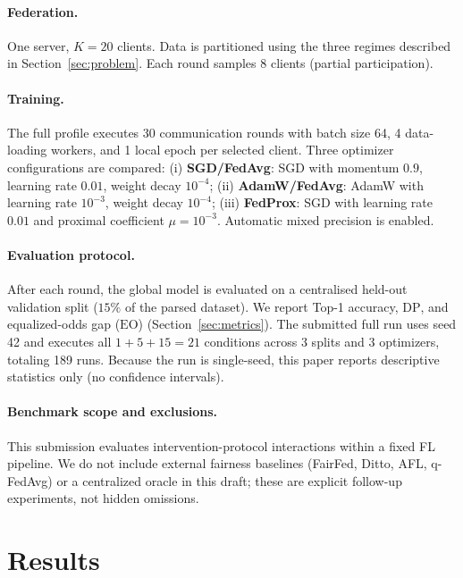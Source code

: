 ﻿\documentclass{article}
\newcommand{\EOpp}{\mathrm{EO}}          %
\newcommand{\DP}{\mathrm{DP}}            %
\begin{document}
\paragraph{Federation.}
One server, $K=20$ clients.
Data is partitioned using the three regimes described in
Section~\ref{sec:problem}.
Each round samples 8 clients (partial participation).

\paragraph{Training.}
The full profile executes 30 communication rounds with batch size 64,
4 data-loading workers, and 1 local epoch per selected client.
Three optimizer configurations are compared:
(i) \textbf{SGD/FedAvg}: SGD with momentum $0.9$, learning rate $0.01$,
weight decay $10^{-4}$;
(ii) \textbf{AdamW/FedAvg}: AdamW with learning rate $10^{-3}$,
weight decay $10^{-4}$;
(iii) \textbf{FedProx}: SGD with learning rate $0.01$ and proximal
coefficient $\mu=10^{-3}$.
Automatic mixed precision is enabled.

\paragraph{Evaluation protocol.}
After each round, the global model is evaluated on a centralised
held-out validation split ($15\%$ of the parsed dataset).
We report Top-1 accuracy, $\DP$, and equalized-odds gap ($\EOpp$)
(Section~\ref{sec:metrics}).
The submitted full run uses seed 42 and executes all
$1 + 5 + 15 = 21$ conditions across
3 splits and 3 optimizers, totaling 189 runs.
Because the run is single-seed, this paper reports descriptive
statistics only (no confidence intervals).

\paragraph{Benchmark scope and exclusions.}
This submission evaluates intervention-protocol interactions within a
fixed FL pipeline.
We do not include external fairness baselines (FairFed, Ditto, AFL,
q-FedAvg) or a centralized oracle in this draft; these are explicit
follow-up experiments, not hidden omissions.

\section{Results}
\label{sec:results}
\end{document}
